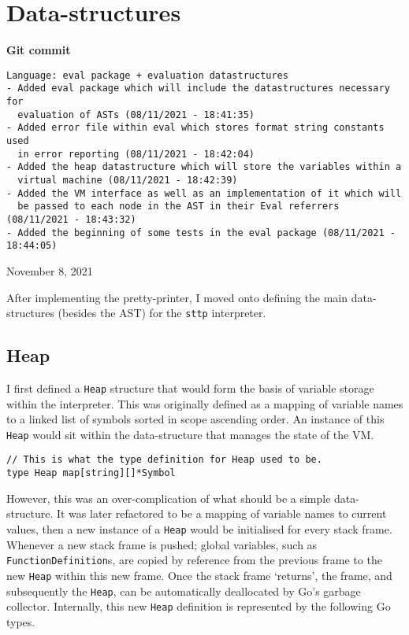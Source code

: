 \section{Data-structures}

\begin{center}
    \textbf{Git commit}
    \begin{verbatim}
Language: eval package + evaluation datastructures
- Added eval package which will include the datastructures necessary for
  evaluation of ASTs (08/11/2021 - 18:41:35)
- Added error file within eval which stores format string constants used
  in error reporting (08/11/2021 - 18:42:04)
- Added the heap datastructure which will store the variables within a
  virtual machine (08/11/2021 - 18:42:39)
- Added the VM interface as well as an implementation of it which will
  be passed to each node in the AST in their Eval referrers (08/11/2021 - 18:43:32)
- Added the beginning of some tests in the eval package (08/11/2021 - 18:44:05)
    \end{verbatim}
    \vspace{-1em}
    \tiny{November 8, 2021}
\end{center}

After implementing the pretty-printer, I moved onto defining the main data-structures (besides the AST) for the \verb|sttp| interpreter.

\subsection{Heap}
\label{sec:data-structures-heap}

I first defined a \verb|Heap| structure that would form the basis of variable storage within the interpreter. This was originally defined as a mapping of variable names to a linked list of symbols sorted in scope ascending order. An instance of this \verb|Heap| would sit within the data-structure that manages the state of the VM.

\begin{verbatim}
// This is what the type definition for Heap used to be.
type Heap map[string][]*Symbol
\end{verbatim}

However, this was an over-complication of what should be a simple data-structure. It was later refactored to be a mapping of variable names to current values, then a new instance of a \verb|Heap| would be initialised for every stack frame. Whenever a new stack frame is pushed; global variables, such as \verb|FunctionDefinition|s, are copied by reference from the previous frame to the new \verb|Heap| within this new frame. Once the stack frame `returns', the frame, and subsequently the \verb|Heap|, can be automatically deallocated by Go's garbage collector. Internally, this new \verb|Heap| definition is represented by the following Go types.

